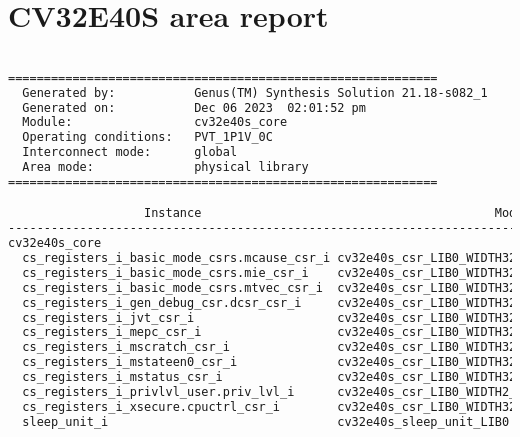 \section{CV32E40S area report}
\label{app:sc_area}

\begin{lstlisting}[caption={Area report from synthesis of the CV32E40S.}, label=lst:cv32e40s_area, language=txt]

============================================================
  Generated by:           Genus(TM) Synthesis Solution 21.18-s082_1
  Generated on:           Dec 06 2023  02:01:52 pm
  Module:                 cv32e40s_core
  Operating conditions:   PVT_1P1V_0C 
  Interconnect mode:      global
  Area mode:              physical library
============================================================

                   Instance                                         Module                        Cell Count  Cell Area  Net Area   Total Area 
-----------------------------------------------------------------------------------------------------------------------------------------------
cv32e40s_core                                                                                          13525  42548.220 20572.873    63121.093 
  cs_registers_i_basic_mode_csrs.mcause_csr_i cv32e40s_csr_LIB0_WIDTH32_SHADOWCOPY1_RESETVALUE0_          29     43.776    39.057       82.833 
  cs_registers_i_basic_mode_csrs.mie_csr_i    cv32e40s_csr_LIB0_WIDTH32_SHADOWCOPY1_RESETVALUE0_          44     69.084    60.059      129.143 
  cs_registers_i_basic_mode_csrs.mtvec_csr_i  cv32e40s_csr_LIB0_WIDTH32_SHADOWCOPY1_RESETVALUE1_          62     96.102    84.367      180.469 
  cs_registers_i_gen_debug_csr.dcsr_csr_i     cv32e40s_csr_LIB0_WIDTH32_SHADOWCOPY1_RESETVALUE10          24     35.568    33.868       69.436 
  cs_registers_i_jvt_csr_i                    cv32e40s_csr_LIB0_WIDTH32_SHADOWCOPY1_RESETVALUE0_          62     96.102    84.367      180.469 
  cs_registers_i_mepc_csr_i                   cv32e40s_csr_LIB0_WIDTH32_SHADOWCOPY1_RESETVALUE0_          72    113.886    98.736      212.622 
  cs_registers_i_mscratch_csr_i               cv32e40s_csr_LIB0_WIDTH32_SHADOWCOPY1_RESETVALUE0_          75    116.964   102.062      219.026 
  cs_registers_i_mstateen0_csr_i              cv32e40s_csr_LIB0_WIDTH32_SHADOWCOPY1_RESETVALUE0_           2      3.078     2.585        5.663 
  cs_registers_i_mstatus_csr_i                cv32e40s_csr_LIB0_WIDTH32_SHADOWCOPY1_RESETVALUE61          14     22.572    19.519       42.091 
  cs_registers_i_privlvl_user.priv_lvl_i      cv32e40s_csr_LIB0_WIDTH2_SHADOWCOPY1_RESETVALUE3_M           5      7.524     6.272       13.796 
  cs_registers_i_xsecure.cpuctrl_csr_i        cv32e40s_csr_LIB0_WIDTH32_SHADOWCOPY1_RESETVALUE25          21     32.832    28.376       61.208 
  sleep_unit_i                                cv32e40s_sleep_unit_LIB0                                     7     21.204     4.067       25.271 


\end{lstlisting}

